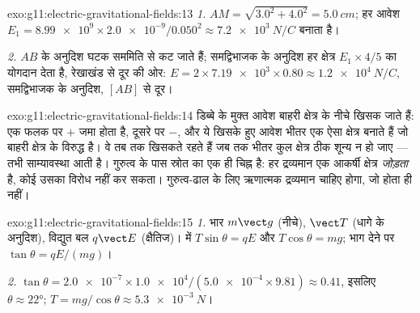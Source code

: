 \begin{solution}{exo:g11:electric-gravitational-fields:13}
\emph{1.} $AM = \sqrt{3.0^2 + 4.0^2} = \qty{5.0}{cm}$; हर आवेश $E_1 = \num{8.99e9} \times \num{2.0e-9} / 0.050^2
\approx \qty{7.2e3}{N/C}$ बनाता है।

\emph{2.} $AB$ के अनुदिश घटक सममिति से कट जाते हैं; समद्विभाजक के अनुदिश
हर क्षेत्र $E_1 \times 4/5$ का योगदान देता है, रेखाखंड से दूर की ओर:
$E = 2 \times \num{7.19e3} \times 0.80 \approx \qty{1.2e4}{N/C}$, समद्विभाजक के अनुदिश, $[AB]$ से दूर।
\end{solution}

\begin{solution}{exo:g11:electric-gravitational-fields:14}
डिब्बे के मुक्त आवेश बाहरी क्षेत्र के नीचे खिसक जाते हैं: एक फलक पर
$+$ जमा होता है, दूसरे पर $-$, और ये खिसके हुए आवेश भीतर एक ऐसा
क्षेत्र बनाते हैं जो बाहरी क्षेत्र के विरुद्ध है। वे तब तक खिसकते
रहते हैं जब तक भीतर कुल क्षेत्र ठीक शून्य न हो जाए --- तभी
साम्यावस्था आती है। गुरुत्व के पास स्रोत का एक ही चिह्न है: हर द्रव्यमान एक
आकर्षी क्षेत्र \emph{जोड़ता} है, कोई उसका विरोध नहीं कर सकता।
गुरुत्व-ढाल के लिए ऋणात्मक द्रव्यमान चाहिए होगा, जो होता ही नहीं।
\end{solution}

\begin{solution}{exo:g11:electric-gravitational-fields:15}
\emph{1.} भार $m\vect g$ (नीचे),  $\vect T$ (धागे के अनुदिश),
विद्युत बल $q\vect E$ (क्षैतिज)।  में $T\sin\theta = qE$ और $T\cos\theta = mg$; भाग देने पर
$\tan\theta = qE/(mg)$।

\emph{2.} $\tan\theta = \num{2.0e-7} \times \num{1.0e4} /
(\num{5.0e-4} \times 9.81) \approx 0.41$, इसलिए $\theta \approx \ang{22}$; $T = mg/\cos\theta \approx \qty{5.3e-3}{N}$।
\end{solution}

